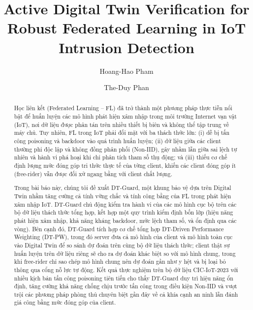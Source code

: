\documentclass[runningheads]{llncs}
\begin{document}
%
\title{Active Digital Twin Verification for Robust Federated Learning in IoT Intrusion Detection}
%
%
\author{Hoang-Hao Pham \and
The-Duy Phan}
%
%
%
\maketitle              %
%
\begin{abstract}
    Học liên kết (Federated Learning -- FL) đã trở thành một phương pháp thực tiễn nổi bật để huấn luyện các mô hình phát hiện xâm nhập trong môi trường Internet vạn vật (IoT), nơi dữ liệu được phân tán trên nhiều thiết bị biên và không thể tập trung về máy chủ. Tuy nhiên, FL trong IoT phải đối mặt với ba thách thức lớn: (i) dễ bị tấn công poisoning và backdoor vào quá trình huấn luyện; (ii) dữ liệu giữa các client thường phi độc lập và không đồng phân phối (Non-IID), gây nhầm lẫn giữa sai lệch tự nhiên và hành vi phá hoại khi chỉ phân tích tham số thụ động; và (iii) thiếu cơ chế định lượng mức đóng góp tri thức thực tế của từng client, khiến các client đóng góp ít (free-rider) vẫn được đối xử ngang bằng với client chất lượng.

    Trong bài báo này, chúng tôi đề xuất DT-Guard, một khung bảo vệ dựa trên Digital Twin nhằm tăng cường cả tính vững chắc và tính công bằng của FL trong phát hiện xâm nhập IoT. DT-Guard chủ động kiểm tra hành vi của các mô hình cục bộ trên các bộ dữ liệu thách thức tổng hợp, kết hợp một quy trình kiểm định bốn lớp (hiệu năng phát hiện xâm nhập, khả năng kháng backdoor, mức lệch tham số, và ổn định qua các vòng). Bên cạnh đó, DT-Guard tích hợp cơ chế tổng hợp DT-Driven Performance Weighting (DT-PW), trong đó server đưa cả mô hình của client và mô hình toàn cục vào Digital Twin để so sánh dự đoán trên cùng bộ dữ liệu thách thức; client thật sự huấn luyện trên dữ liệu riêng sẽ cho ra dự đoán khác biệt so với mô hình chung, trong khi free-rider chỉ sao chép mô hình chung nên dự đoán gần như y hệt và bị loại bỏ thông qua cổng nỗ lực tự động. Kết quả thực nghiệm trên bộ dữ liệu CIC-IoT-2023 với nhiều kịch bản tấn công poisoning tiên tiến cho thấy DT-Guard duy trì hiệu năng ổn định, tăng cường khả năng chống chịu trước tấn công trong điều kiện Non-IID và vượt trội các phương pháp phòng thủ chuyên biệt gần đây về cả khía cạnh an ninh lẫn đánh giá công bằng mức đóng góp của client.


\end{abstract}
\end{document}
